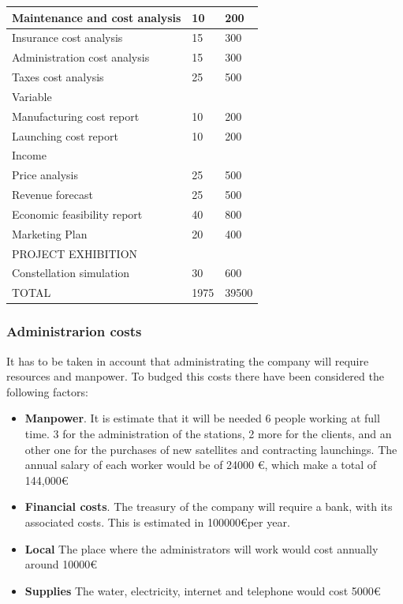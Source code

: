 \begin{tabular}{ | l | l | l | }
	Maintenance and cost analysis & 10 & 200 \\ \hline
	Insurance cost analysis & 15 & 300 \\ \hline
	Administration cost analysis & 15 & 300 \\ \hline
	Taxes cost analysis & 25 & 500 \\ \hline
	Variable &  &  \\ \hline
	Manufacturing cost report & 10 & 200 \\ \hline
	Launching cost report & 10 & 200 \\ \hline
	Income &  &  \\ \hline
	Price analysis & 25 & 500 \\ \hline
	Revenue forecast & 25 & 500 \\ \hline
	Economic feasibility report & 40 & 800 \\ \hline
	Marketing Plan & 20 & 400 \\ \hline
	PROJECT EXHIBITION &  &  \\ \hline
	Constellation simulation & 30 & 600 \\ \hline
	TOTAL & 1975 & 39500 \\ \hline
\end{tabular}

\subsubsection{Administrarion costs}
It has to be taken in account that administrating the company will require resources and manpower. To budged this costs there have been considered the following factors:

\begin{itemize}
\item \textbf{Manpower}. It is estimate that it will be needed 6 people working at full time. 3 for the administration of the stations, 2 more for the clients, and an other one for the purchases of new satellites and contracting launchings. The annual salary of each worker would be of 24000 \euro, which make a total of 144,000\euro
\item \textbf{Financial costs}. The treasury of the company will require a  bank, with its associated costs. This is estimated in 100000\euro  per year.
\item \textbf{Local} The place where the administrators will work would cost annually around 10000\euro
\item \textbf{Supplies} The water, electricity, internet and telephone would cost 5000\euro
\end{itemize}

